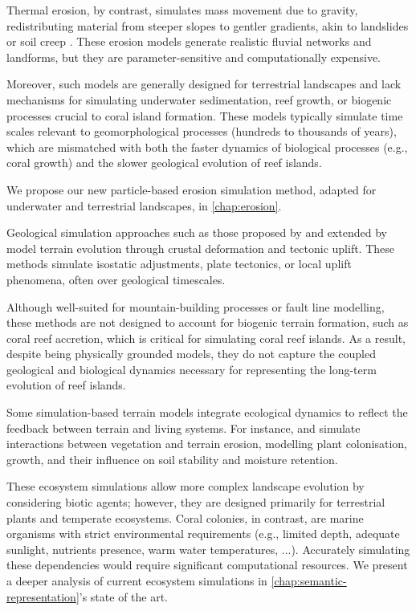 Thermal erosion, by contrast, simulates mass movement due to gravity, redistributing material from steeper slopes to gentler gradients, akin to landslides or soil creep \cite{Benes2006}. These erosion models generate realistic fluvial networks and landforms, but they are parameter-sensitive and computationally expensive.

Moreover, such models are generally designed for terrestrial landscapes and lack mechanisms for simulating underwater sedimentation, reef growth, or biogenic processes crucial to coral island formation. These models typically simulate time scales relevant to geomorphological processes (hundreds to thousands of years), which are mismatched with both the faster dynamics of biological processes (e.g., coral growth) and the slower geological evolution of reef islands.

We propose our new particle-based erosion simulation method, adapted for underwater and terrestrial landscapes, in \cref{chap:erosion}.


Geological simulation approaches such as those proposed by \cite{Cordonnier2016, Cordonnier2017a} and extended by \cite{Schott2023} model terrain evolution through crustal deformation and tectonic uplift. These methods simulate isostatic adjustments, plate tectonics, or local uplift phenomena, often over geological timescales.

Although well-suited for mountain-building processes or fault line modelling, these methods are not designed to account for biogenic terrain formation, such as coral reef accretion, which is critical for simulating coral reef islands. As a result, despite being physically grounded models, they do not capture the coupled geological and biological dynamics necessary for representing the long-term evolution of reef islands.


Some simulation-based terrain models integrate ecological dynamics to reflect the feedback between terrain and living systems. For instance, \cite{Ecormier-Nocca2021} and \cite{Cordonnier2017b} simulate interactions between vegetation and terrain erosion, modelling plant colonisation, growth, and their influence on soil stability and moisture retention.

These ecosystem simulations allow more complex landscape evolution by considering biotic agents; however, they are designed primarily for terrestrial plants and temperate ecosystems. Coral colonies, in contrast, are marine organisms with strict environmental requirements (e.g., limited depth, adequate sunlight, nutrients presence, warm water temperatures, ...). Accurately simulating these dependencies would require significant computational resources. We present a deeper analysis of current ecosystem simulations in \cref{chap:semantic-representation}'s state of the art.

